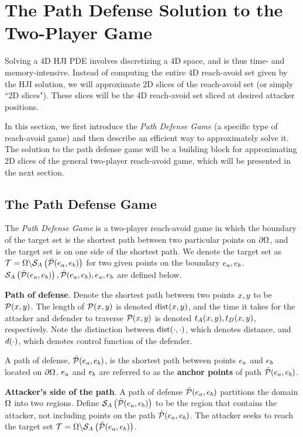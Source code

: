 \section{The Path Defense Solution to the Two-Player Game}
\label{sec:path_defense}
Solving a 4D HJI PDE involves discretizing a 4D space, and is thus time- and memory-intensive. Instead of computing the entire 4D reach-avoid set given by the HJI solution, we will approximate 2D slices of the reach-avoid set (or simply ``2D slices"). These slices will be the 4D reach-avoid set sliced at desired attacker positions.

In this section, we first introduce the \textit{Path Defense Game} (a specific type of reach-avoid game) and then describe an efficient way to approximately solve it. The solution to the path defense game will be a building block for approximating 2D slices of the general two-player reach-avoid game, which will be presented in the next section.

\subsection{The Path Defense Game}
The \textit{Path Defense Game} is a two-player reach-avoid game in which the boundary of the target set is the shortest path between two particular points on $\partial\Omega$, and the target set is on one side of the shortest path. We denote the target set as $\mathcal{T}=\Omega\backslash\mathcal{S}_A\left(\bar{\mathcal{P}}(e_a,e_b)\right)$ for two given points on the boundary $e_a,e_b$. $\mathcal{S}_A\left(\bar{\mathcal{P}}(e_a,e_b)\right),\bar{\mathcal{P}}(e_a,e_b),e_a,e_b$ are defined below. 

\begin{defn} %
\textbf{Path of defense}. Denote the shortest path between two points $x,y$ to be $\mathcal{P}(x,y)$. The length of $\mathcal{P}(x,y)$ is denoted $\text{dist}(x,y)$, and the time it takes for the attacker and defender to traverse $\mathcal{P}(x,y)$ is denoted $t_A(x, y),t_D(x,y)$, respectively. Note the distinction between $\text{dist}(\cdot,\cdot)$, which denotes distance, and $d(\cdot)$, which denotes control function of the defender.

A path of defense, $\bar{\mathcal{P}}(e_a,e_b)$, is the shortest path between points $e_a$ and $e_b$ located on $\partial\Omega$. $e_a$ and $e_b$ are referred to as the \textbf{anchor points} of path $\bar{\mathcal{P}}(e_a,e_b)$. 
\end{defn}

\begin{defn} %
\textbf{Attacker's side of the path}. A path of defense $\bar{\mathcal{P}}(e_a,e_b)$ partitions the domain $\Omega$ into two regions. Define $\mathcal{S}_A\left(\bar{\mathcal{P}}(e_a,e_b)\right)$ to be the region that contains the attacker, not including points on the path $\bar{\mathcal{P}}(e_a,e_b)$. The attacker seeks to reach the target set $\mathcal{T}=\Omega\backslash\mathcal{S}_A\left(\bar{\mathcal{P}}(e_a,e_b)\right)$.
\end{defn}


